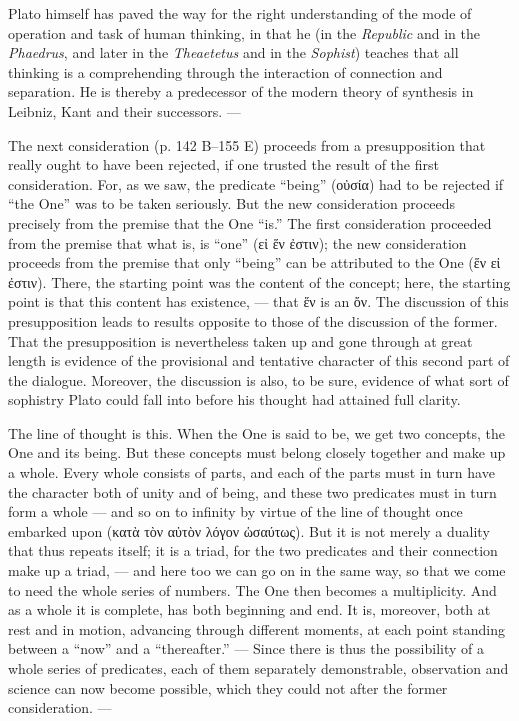 \documentclass[12pt,a4paper,openany]{book}
\newcommand{\opage}[1]{\marginnote{\footnotesize\textit{[#1]}}}
\begin{document}
Plato himself has paved the way for the right understanding
of the mode of operation and task of human thinking, in that
he (in the \textit{Republic} and in the \textit{Phaedrus}, and later in the \textit{Theaetetus}
and in the \textit{Sophist}) teaches that all thinking is a comprehending
through the interaction of connection and separation. He is
thereby a predecessor of the modern theory of synthesis in
Leibniz, Kant and their successors. ---

The next consideration (p. 142 B--155 E) proceeds from a
presupposition that really ought to have been rejected, if one
trusted the result of the first consideration.  For, as
we saw, the predicate ``being'' (οὐσία) had to be rejected if
``the One'' was to be taken seriously.  But the new consideration
proceeds precisely from the premise that the One ``is.''  The first
consideration proceeded from the premise that what is, is ``one'' (εἰ ἕν ἐστιν);
the new consideration proceeds from the premise that only ``being''
can be attributed to the One (ἕν εἰ ἐστιν).  There, the starting point was
the content of the concept; here, the starting point is that this content
has existence, --- that ἕν is an ὄν.  The discussion of this presupposition
leads to results opposite to those of the discussion of the
\setcounter{footnote}{0}%
\opage{33}former.  That the presupposition is nevertheless taken up and gone through at great length is evidence of the provisional
and tentative character of this second part of the dialogue.  Moreover, the discussion
is also, to be sure, evidence of what sort of sophistry
Plato could fall into before his thought had attained
full clarity.

The line of thought is this.  When the One is said to be,
we get two concepts, the One and its being.  But these
concepts must belong closely together and make up a whole.
Every whole consists of parts, and each of the parts
must in turn have the character both of unity and of being,
and these two predicates must in turn form a whole --- and so
on to infinity by virtue of the line of thought once embarked upon
(κατὰ τὸν αὐτὸν λόγον ὡσαύτως).  But it is
not merely a duality that thus repeats itself; it is a
triad, for the two predicates and their connection make up
a triad, --- and here too we can go on in the same
way, so that we come to need the whole series of numbers.  The One
then becomes a multiplicity.  And as a whole it is complete,
has both beginning and end.  It is, moreover,
both at rest and in motion, advancing through different
moments, at each point standing between a
``now'' and a ``thereafter.''  --- Since there is thus the possibility of a
whole series of predicates, each of them separately demonstrable, observation
and science can now become possible, which they
could not after the former consideration. ---
\end{document}
